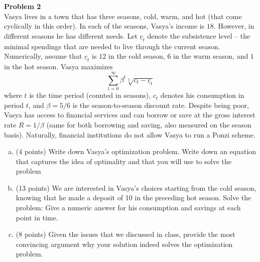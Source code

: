 \documentclass{article}
\newenvironment{problem}[2][Problem]
    { \begin{mdframed}[backgroundcolor=gray!20] \textbf{#1 #2} \\}
    {  \end{mdframed}}
\begin{document}
\begin{problem}{2}
	Vasya lives in a town that has three seasons, cold,
	warm, and hot (that come cyclically in this order). In each of the seasons, Vasya’s income is
	$ 18 $. However, in different seasons he has different needs. Let $ \underline{c}_{t} $ denote the subsistence level -- the
	minimal spendings that are needed to live through the current season. Numerically, assume that
	$ \underline{c}_{t} $ is $ 12 $ in the cold season, $ 6 $ in the warm season, and $ 1 $ in the hot season. Vasya maximizes
	\[
	\sum_{t=0}^{\infty}\beta^{t}\sqrt[3]{c_{t} - \underline{c}_{t}}
	\] where $ t $ is the time period (counted in seasons), $ c_{t} $ denotes his consumption in
	period $ t $, and $ \beta = 5/6 $ is the season-to-season discount rate.
	Despite being poor, Vasya has access to financial services and can borrow or save at the gross
	interest rate $ R = 1/\beta $
	(same for both borrowing and saving, also measured on the season basis).
	Naturally, financial institutions do not allow Vasya to run a Ponzi scheme.
	\begin{enumerate}[(a)]
		\item (4 points) Write down Vasya’s optimization problem. Write down an equation that captures
		the idea of optimality and that you will use to solve the problem
		\item  (13 points) We are interested in Vasya’s choices starting from the cold season, knowing that
		he made a deposit of 10 in the preceding hot season. Solve the problem: Give a numeric
		answer for his consumption and savings at each point in time.
		\item  (8 points) Given the issues that we discussed in class, provide the most convincing argument
		why your solution indeed solves the optimization problem.
	\end{enumerate}
\end{problem}{2}
\end{document}
